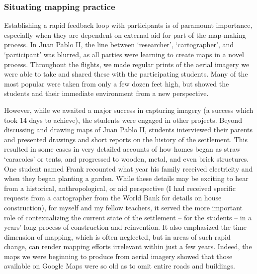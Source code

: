 \documentclass[11pt]{report}
\begin{document}
\subsubsection{Situating mapping practice}

Establishing a rapid feedback loop with participants is of paramount importance, especially when they are dependent on external aid for part of the map-making process. In Juan Pablo II, the line between `researcher', `cartographer', and `participant' was blurred, as all parties were learning to create maps in a novel process. Throughout the flights, we made regular prints of the aerial imagery we were able to take and shared these with the participating students. Many of the most popular were taken from only a few dozen feet high, but showed the students and their immediate environment from a new perspective. 

However, while we awaited a major success in capturing imagery (a success which took 14 days to achieve), the students were engaged in other projects. Beyond discussing and drawing maps of Juan Pablo II, students interviewed their parents and presented drawings and short reports on the history of the settlement. This resulted in some cases in very detailed accounts of how homes began as straw `caracoles' or tents, and progressed to wooden, metal, and even brick structures. One student named Frank recounted what year his family received electricity and when they began planting a garden. While these details may be exciting to hear from a historical, anthropological, or aid perspective (I had received specific requests from a cartographer from the World Bank for details on house construction), for myself and my fellow teachers, it served the more important role of contexualizing the current state of the settlement -- for the students -- in a years' long process of construction and reinvention. It also emphasized the time dimension of mapping, which is often neglected, but in areas of such rapid change, can render mapping efforts irrelevant within just a few years. Indeed, the maps we were beginning to produce from aerial imagery showed that those available on Google Maps were so old as to omit entire roads and buildings.
\end{document}
